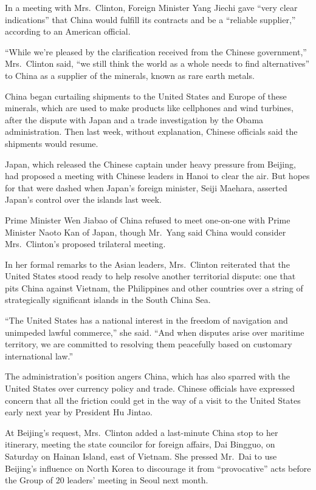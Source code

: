 ﻿\documentclass[12pt]{article}
\begin{document}
In a meeting with Mrs.~Clinton, Foreign Minister Yang Jiechi gave ``very clear indications'' that
China would fulfill its contracts and be a ``reliable supplier,'' according to an American official.

``While we're pleased by the clarification received from the Chinese government,'' Mrs.~Clinton
said, ``we still think the world as a whole needs to find alternatives'' to China as a supplier of
the minerals, known as rare earth metals.

China began curtailing shipments to the United States and Europe of these minerals, which are used
to make products like cellphones and wind turbines, after the dispute with Japan and a trade
investigation by the Obama administration. Then last week, without explanation, Chinese officials
said the shipments would resume.

Japan, which released the Chinese captain under heavy pressure from Beijing, had proposed a meeting
with Chinese leaders in Hanoi to clear the air. But hopes for that were dashed when Japan's foreign
minister, Seiji Maehara, asserted Japan's control over the islands last week.

Prime Minister Wen Jiabao of China refused to meet one-on-one with Prime Minister Naoto Kan of
Japan, though Mr.~Yang said China would consider Mrs.~Clinton's proposed trilateral meeting.

In her formal remarks to the Asian leaders, Mrs.~Clinton reiterated that the United States stood
ready to help resolve another territorial dispute: one that pits China against Vietnam, the
Philippines and other countries over a string of strategically significant islands in the South
China Sea.

``The United States has a national interest in the freedom of navigation and unimpeded lawful
commerce,'' she said. ``And when disputes arise over maritime territory, we are committed to
resolving them peacefully based on customary international law.''

The administration's position angers China, which has also sparred with the United States over
currency policy and trade. Chinese officials have expressed concern that all the friction could get
in the way of a visit to the United States early next year by President Hu Jintao.

At Beijing's request, Mrs.~Clinton added a last-minute China stop to her itinerary, meeting the
state councilor for foreign affairs, Dai Bingguo, on Saturday on Hainan Island, east of Vietnam. She
pressed Mr.~Dai to use Beijing's influence on North Korea to discourage it from ``provocative'' acts
before the Group of 20 leaders' meeting in Seoul next month.
\end{document}
